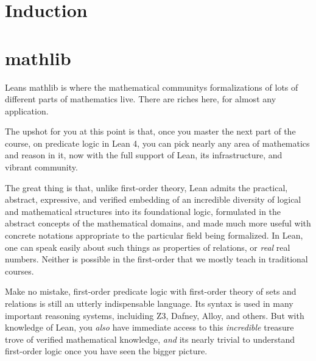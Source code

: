 \documentclass{book}
\begin{document}
\hypertarget{pandoc.profile.debug__pandoc__debug__src__dmt1__lectures__l06_induction__induction.lean.md}{}
\hypertarget{pandoc.profile.debug__pandoc__debug__src__dmt1__lectures__l06_induction__induction.lean.md__induction}{%
\chapter{Induction}\label{pandoc.profile.debug__pandoc__debug__src__dmt1__lectures__l06_induction__induction.lean.md__induction}}

\hypertarget{pandoc.profile.debug__pandoc__debug__src__mathlib.md}{}
\hypertarget{pandoc.profile.debug__pandoc__debug__src__mathlib.md__mathlib}{%
\chapter{mathlib}\label{pandoc.profile.debug__pandoc__debug__src__mathlib.md__mathlib}}

Lean\textquotesingle s mathlib is where the mathematical community\textquotesingle s formalizations
of lots of different parts of mathematics live. There are riches here,
for almost any application.

The upshot for you at this point is that, once you master the next part of the course, on predicate logic in Lean 4, you can pick nearly any area
of mathematics and reason in it, now with the full support of Lean, its infrastructure, and vibrant community.

The great thing is that, unlike first-order theory, Lean admits the practical, abstract, expressive, and verified embedding of an incredible diversity of logical and mathematical structures into its foundational logic, formulated in the abstract concepts of the mathematical domains, and made much more useful with concrete notations appropriate to the particular field being formalized. In Lean, one can speak easily about such things as properties of relations, or \emph{real} real numbers. Neither is possible in the first-order that we mostly teach in traditional courses.

Make no mistake, first-order predicate logic with first-order theory of sets and relations is still an utterly indispensable language. It\textquotesingle s syntax is used in many important reasoning systems, incluiding Z3, Dafney, Alloy, and others. But with knowledge of Lean, you \emph{also} have immediate access to this \emph{incredible} treasure trove of verified mathematical knowledge, \emph{and} it\textquotesingle s nearly trivial to understand first-order logic once you have seen the bigger picture.
\end{document}
